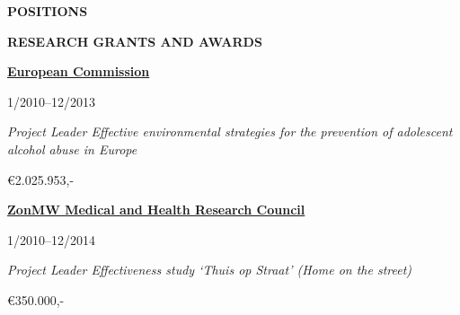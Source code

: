 \documentclass[
  16,
]{article}
\begin{document}
\begin{large}{\bf POSITIONS}
\begin{large}{\bf RESEARCH GRANTS AND AWARDS}
\vspace{7pt}


\begin{multicols}{2}
    \begin{flushleft}{\bf \href{https://english.rvo.nl/subsidies-programmes/horizon-europe-research-and-innovation#}{European Commission}}\end{flushleft}
    \begin{flushright}1/2010–12/2013\end{flushright}
  \end{multicols}
  \vspace{-0.17cm}
  \begin{multicols}{2}
    \begin{flushleft}\textit{Project Leader Effective environmental strategies for the prevention of adolescent alcohol abuse in Europe}\end
    {flushleft}
    \begin{flushright}€2.025.953,-  \end
    {flushright}
  \end{multicols}

\vspace{7pt}


\begin{multicols}{2}
    \begin{flushleft}{\bf \href{https://www.zonmw.nl/nl/}{ZonMW Medical and Health Research Council}}\end{flushleft}
    \begin{flushright}1/2010–12/2014\end{flushright}
  \end{multicols}
  \vspace{-0.17cm}
  \begin{multicols}{2}
    \begin{flushleft}\textit{Project Leader Effectiveness study ‘Thuis op Straat’ (Home on the street)}\end
    {flushleft}
    \begin{flushright}€350.000,-  \end
    {flushright}
  \end{multicols}

\vspace{7pt}



\end{large}
\end{large}
\end{document}
